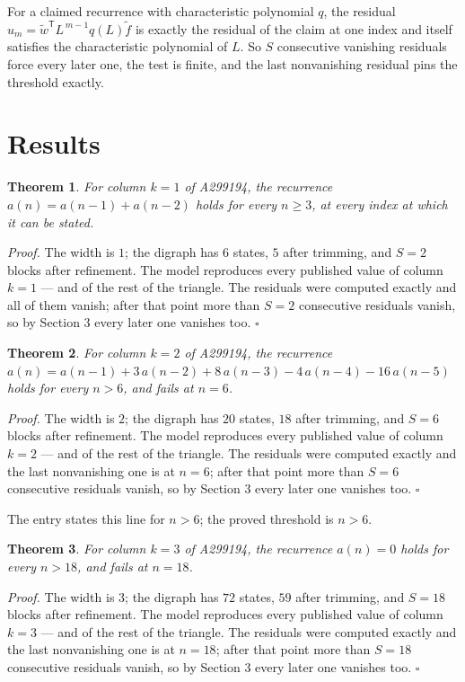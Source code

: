 \documentclass[11pt]{article}
\newtheorem{theorem}{Theorem}
\theoremstyle{definition}
\begin{document}
For a claimed recurrence with characteristic polynomial $q$, the residual $u_m = \tilde w^{\mathsf T}L^{\,m-1}q(L)\tilde f$ is exactly the residual of the claim at one index and itself satisfies the characteristic polynomial of $L$. So $S$ consecutive vanishing residuals force every later one, the test is finite, and the last nonvanishing residual pins the threshold exactly.

\section{Results}

\begin{theorem} For column $k = 1$ of A299194, the recurrence $a(n) = a(n-1) + a(n-2)$ holds for every $n \ge 3$, at every index at which it can be stated.\end{theorem}

{\itshape Proof.} The width is $1$; the digraph has $6$ states, $5$ after trimming, and $S = 2$ blocks after refinement. The model reproduces every published value of column $k = 1$ --- and of the rest of the triangle. The residuals were computed exactly and all of them vanish; after that point more than $S = 2$ consecutive residuals vanish, so by Section 3 every later one vanishes too. $\square$

\begin{theorem} For column $k = 2$ of A299194, the recurrence $a(n) = a(n-1) + 3\,a(n-2) + 8\,a(n-3) - 4\,a(n-4) - 16\,a(n-5)$ holds for every $n > 6$, and fails at $n = 6$.\end{theorem}

{\itshape Proof.} The width is $2$; the digraph has $20$ states, $18$ after trimming, and $S = 6$ blocks after refinement. The model reproduces every published value of column $k = 2$ --- and of the rest of the triangle. The residuals were computed exactly and the last nonvanishing one is at $n = 6$; after that point more than $S = 6$ consecutive residuals vanish, so by Section 3 every later one vanishes too. $\square$

The entry states this line for $n > 6$; the proved threshold is $n > 6$.

\begin{theorem} For column $k = 3$ of A299194, the recurrence $a(n) = 0$ holds for every $n > 18$, and fails at $n = 18$.\end{theorem}

{\itshape Proof.} The width is $3$; the digraph has $72$ states, $59$ after trimming, and $S = 18$ blocks after refinement. The model reproduces every published value of column $k = 3$ --- and of the rest of the triangle. The residuals were computed exactly and the last nonvanishing one is at $n = 18$; after that point more than $S = 18$ consecutive residuals vanish, so by Section 3 every later one vanishes too. $\square$
\end{document}
